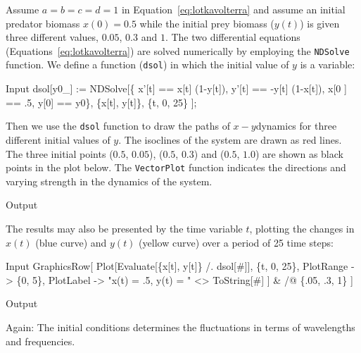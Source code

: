 \documentclass[11pt,fleqn]{book} %
\begin{document}
\begin{theorem}
\hfill \break
Assume $a = b = c = d = 1$ in Equation~\ref{eq:lotkavolterra} and assume an initial predator biomass $x(0) = 0.5$ while the initial prey biomass ($y(t)$) is given three different values, $0.05$, $0.3$ and $1$. The two differential equations (Equations~\ref{eq:lotkavolterra}) are solved numerically by employing the \texttt{NDSolve} function. We define a function (\texttt{dsol}) in which the initial value of $y$ is a variable:
\begin{mmaCell}[index=1]{Input}
  dsol[y0_] := 
    NDSolve[\{
      x'[t] == x[t] (1-y[t]), 
      y'[t] == -y[t] (1-x[t]), 
      x[0 ] == .5, 
      y[0]  == y0\},
      \{x[t], y[t]\}, \{t, 0, 25\}
    ];
\end{mmaCell}
Then we use the \texttt{dsol} function to draw the paths of $x-y$\textendash dynamics for three different initial values of $y$. The isoclines of the system are drawn as red lines. The three initial points \textendash \space ($0.5$, $0.05$), ($0.5$, $0.3$) and ($0.5$, $1.0$) \textendash \space are shown as black points in the plot below. The \texttt{VectorPlot} function indicates the directions and varying strength in the dynamics of the system.
\begin{mmaCell}[moregraphics={moreig={scale=.5}}]{Output}
\end{mmaCell}
The results may also be presented by the time variable $t$, plotting the changes in $x(t)$ (blue curve) and $y(t)$ (yellow curve) over a period of 25 time steps:
\begin{mmaCell}{Input}
  GraphicsRow[
    Plot[Evaluate[\{x[t], y[t]\} /. dsol[#]], \{t, 0, 25\},
      PlotRange -> \{0, 5\}, 
      PlotLabel -> "x(t) = .5, y(t) = " <> ToString[#]
    ] & /@ \{.05, .3, 1\}
  ]
\end{mmaCell}
\begin{mmaCell}[moregraphics={moreig={scale=.5}}]{Output}
\end{mmaCell}
Again: The initial conditions determines the fluctuations in terms of wavelengths and frequencies.
\label{code:lotkavolterra}
\end{theorem}
\end{document}
